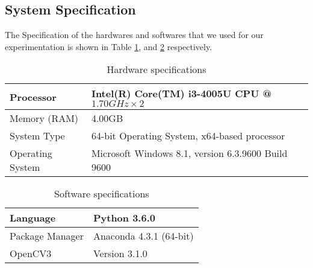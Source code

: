 
\subsection{System Specification}
The Specification of the hardwares and softwares that we used for our experimentation is shown in Table \ref{table:HardwareSpecification}, and \ref{table:SoftwareSpecification} respectively.

\begin{table}[hb]
\centering
\begin{tabular}{|l|l|}
\hline
Processor & Intel(R) Core(TM) i3-4005U CPU @ $1.70GHz \times 2$ \\
\hline
Memory (RAM) & 4.00GB \\ 
\hline
System Type & 64-bit Operating System, x64-based processor \\ 
\hline
Operating System & Microsoft Windows 8.1, version 6.3.9600 Build 9600 \\
\hline 
\end{tabular}
\caption{Hardware specifications}
\label{table:HardwareSpecification}
\end{table} 

\begin{table}[hb]
\centering
\begin{tabular}{|l|l|}
\hline
Language & Python 3.6.0 \\ 
\hline
Package Manager & Anaconda 4.3.1 (64-bit) \\ 
\hline
OpenCV3 & Version 3.1.0 \\
\hline
\end{tabular}
\caption{Software specifications}
\label{table:SoftwareSpecification}
\end{table} 


